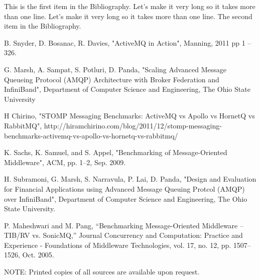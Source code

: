 \documentclass{thesis}
\begin{document}
\begin{singlespace}
\begin{thebibliography}{99}

 This is the first item in the Bibliography.
Let's make it very long so it takes more than one line.
Let's make it very long so it takes more than one line.
 The second item in the Bibliography.

 B. Snyder, D. Bosanac, R. Davies, "ActiveMQ in Action", Manning, 2011 pp 1 – 326.

 G. Marsh, A. Sampat, S. Potluri, D. Panda, "Scaling Advanced Message Queueing Protocol (AMQP) Architecture with Broker Federation and InfiniBand", Department of Computer Science and Engineering, The Ohio State University

 H Chirino, "STOMP Messaging Benchmarks: ActiveMQ vs Apollo vs HornetQ vs RabbitMQ", http://hiramchirino.com/blog/2011/12/stomp-messaging-benchmarks-activemq-vs-apollo-vs-hornetq-vs-rabbitmq/

 K. Sachs, K. Samuel, and S. Appel, "Benchmarking of Message-Oriented Middleware", ACM, pp. 1–2, Sep. 2009.

 H. Subramoni, G. Marsh, S. Narravula, P. Lai, D. Panda, "Design and Evaluation for Financial Applications using Advanced Message Queuing Protcol (AMQP) over InfiniBand", Department of Computer Science and Engineering, The Ohio State University.

 P. Maheshwari and M. Pang, “Benchmarking Message-Oriented Middleware – TIB/RV vs. SonicMQ,” Journal Concurrency and Computation: Practice and Experience - Foundations of Middleware Technologies, vol. 17, no. 12, pp. 1507–1526, Oct. 2005.

NOTE: Printed copies of all sources are available upon request. 

\end{thebibliography}
\end{singlespace}
\end{document}

